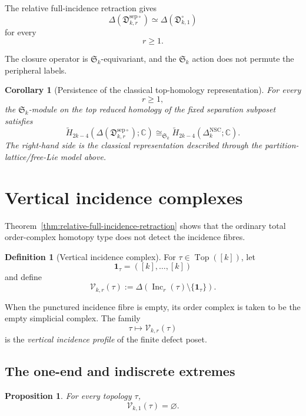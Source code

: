 \documentclass[11pt]{article}
\theoremstyle{plain}
\newtheorem{proposition}[theorem]{Proposition}
\newtheorem{corollary}[theorem]{Corollary}
\theoremstyle{definition}
\newtheorem{definition}[theorem]{Definition}
\begin{document}
The relative full-incidence retraction gives
\[
\Delta(
\mathfrak D_{k,r}^{\mathrm{sep}\circ}
)
\simeq
\Delta(
\mathfrak D_{k,1}^{\circ}
)
\]
for every
\[
r\geq1.
\]

The closure operator is $\mathfrak S_k$-equivariant, and the
$\mathfrak S_k$ action does not permute the peripheral labels.

\begin{corollary}[Persistence of the classical top-homology representation]
\label{cor:Lie-persists}
For every
\[
r\geq1,
\]
the $\mathfrak S_k$-module on the top reduced homology of the fixed
separation subposet satisfies
\[
\widetilde H_{2k-4}
\left(
\Delta(
\mathfrak D_{k,r}^{\mathrm{sep}\circ}
);
\mathbb C
\right)
\cong_{\mathfrak S_k}
\widetilde H_{2k-4}
\left(
\Delta_k^{\mathrm{NSC}};
\mathbb C
\right).
\]
The right-hand side is the classical representation described through the
partition-lattice/free-Lie model above.
\end{corollary}



\section{Vertical incidence complexes}
\label{sec:vertical-incidence-complexes}

Theorem~\ref{thm:relative-full-incidence-retraction} shows that the ordinary total
order-complex homotopy type does not detect the incidence fibres.

\begin{definition}[Vertical incidence complex]
\label{def:vertical-incidence-complex}
For $\tau\in\operatorname{Top}([k])$, let
\[
\mathbf1_\tau=([k],\ldots,[k])
\]
and define
\[
\mathcal V_{k,r}(\tau)
:=
\Delta
\left(
\operatorname{Inc}_r(\tau)
\setminus\{\mathbf1_\tau\}
\right).
\]
\end{definition}

When the punctured incidence fibre is empty, its order complex is taken to be
the empty simplicial complex.  The family
\[
\tau\longmapsto\mathcal V_{k,r}(\tau)
\]
is the \emph{vertical incidence profile} of the finite defect poset.
\subsection{The one-end and indiscrete extremes}
\label{subsec:vertical-extremes}


\begin{proposition}
\label{prop:vertical-r1-empty}
For every topology $\tau$,
\[
\mathcal V_{k,1}(\tau)=\varnothing.
\]
\end{proposition}
\end{document}
